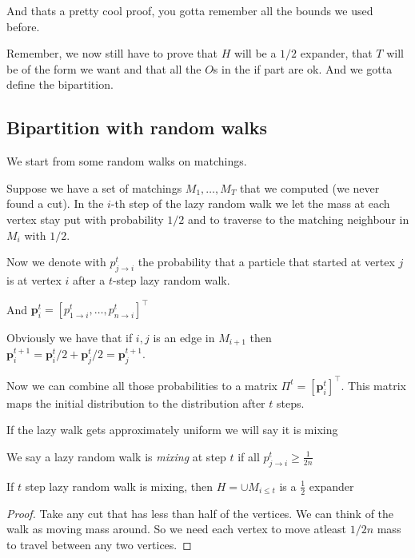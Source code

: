 And thats a pretty cool proof, you gotta remember all the bounds we used before.


Remember, we now still have to prove that $H$ will be a $1/2$ expander, that $T$ will be of the form we want and that all the $O$s in the if part are ok. And we gotta define the bipartition.


\subsection{Bipartition with random walks}

We start from some random walks on matchings.

\begin{definicija}
    Suppose we have a set of matchings $M_1, \ldots, M_T$ that we computed (we never found a cut). In the $i$-th step of the lazy random walk we let the mass at each vertex stay put with probability $1/2$ and to traverse to the matching neighbour in $M_i$ with $1/2$.

    Now we denote with $p_{j \rightarrow i} ^t$ the probability that a particle that started at vertex $j$ is at vertex $i$ after a $t$-step lazy random walk.

    And $\mathbf{p}_i^t = [p_{1 \rightarrow i}^t, \ldots, p_{n \rightarrow i}^t]^\top$

    Obviously we have that if $i,j$ is an edge in $M_{i+1}$ then $\mathbf{p}_i^{t+1} = \mathbf{p}_i^{t}/2 + \mathbf{p}_j^{t}/2 = \mathbf{p}_j^{t+1}$.

    Now we can combine all those probabilities to a matrix $\Pi^t =[\mathbf{p}_i^{t}]^\top$. This matrix maps the initial distribution to the distribution after $t$ steps.

    If the lazy walk gets approximately uniform we will say it is mixing

    \begin{definicija}
        We say a lazy random walk is \textit{mixing} at step $t$ if all $p_{j \rightarrow i} ^t \geq \frac{1}{2n}$
    \end{definicija}

    \begin{lema}
        If $t$ step lazy random walk is mixing, then $H = \cup M_{i\leq t}$ is a $\frac 1 2$ expander
    \end{lema}

    \begin{proof}
        Take any cut that has less than half of the vertices. We can think of the walk as moving mass around. So we need each vertex to move atleast $1/2n$ mass to travel between any two vertices.


\end{proof}
\end{definicija}
